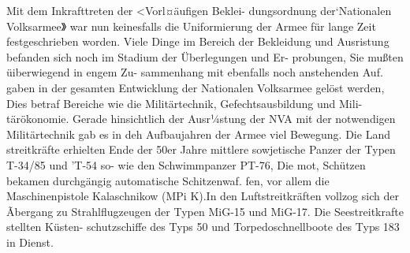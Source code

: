 

Mit dem Inkrafttreten der <Vorl¤äufigen Beklei-
dungsordnung der`Nationalen Volksarmee》 war
nun keinesfalls die Uniformierung der Armee für
lange Zeit festgeschrieben worden. Viele Dinge im
Bereich der Bekleidung und Ausristung befanden
sich noch im Stadium der Überlegungen und Er-
probungen, Sie mußten üiberwiegend in engem Zu-
sammenhang mit ebenfalls noch anstehenden Auf.
gaben in der gesamten Entwicklung der Nationalen
Volksarmee gelöst werden, Dies betraf Bereiche wie
die Militärtechnik, Gefechtsausbildung und Mili-
tärökonomie.
Gerade hinsichtlich der Ausr¼stung
der NVA
mit der notwendigen Militärtechnik gab es in deh
Aufbaujahren der Armee viel Bewegung. Die Land
streitkräfte erhielten Ende der 50er Jahre mittlere
sowjetische Panzer der Typen T-34/85 und 'T-54 so-
wie den Schwimmpanzer PT-76, Die mot, Schützen
bekamen durchgängig automatische Schitzenwaf.
fen, vor allem die Maschinenpistole Kalaschnikow
(MPi K).In den Luftstreitkräften vollzog sich der
Ãbergang zu Strahlflugzeugen der Typen MiG-15
und MiG-17. Die Seestreitkrafte stellten Küsten-
schutzschiffe des Typs 50 und Torpedoschnellboote
des Typs 183 in Dienst.